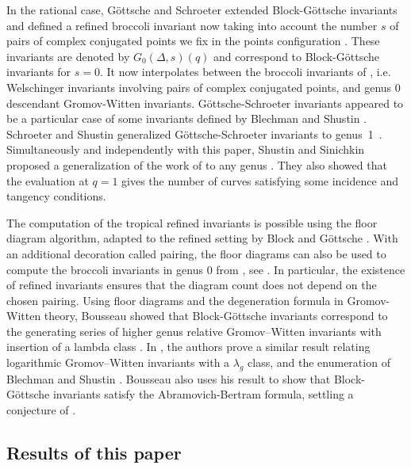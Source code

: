 \documentclass[11pt]{article}
\theoremstyle{definition}
\numberwithin{equation}{section}
\theoremstyle{plain}
\begin{document}
In the rational case, Göttsche and Schroeter extended Block-Göttsche invariants and  defined a refined broccoli invariant now taking into account the number $s$ of pairs of complex conjugated points we fix in the points configuration \cite{gottsche_refined_2019}. These invariants are denoted by $G_0(\Delta,s)(q)$ and correspond to Block-Göttsche invariants for $s=0$. It now interpolates between the broccoli invariants of \cite{gathmann-2013-broccoli}, i.e.  Welschinger invariants involving pairs of complex conjugated points, and genus $0$ descendant Gromov-Witten invariants.  Göttsche-Schroeter invariants appeared to be a particular case of some invariants defined by Blechman and Shustin \cite{blechman-2019-refined}.
Schroeter and Shustin generalized Göttsche-Schroeter invariants to genus~1~\cite{schroeter-2018-refined}. Simultaneously and independently with this paper, Shustin and Sinichkin proposed a generalization of the work of \cite{schroeter-2018-refined} to any genus \cite{shustin-2024-refined}. They also showed that the evaluation at $q = 1$ gives the number of curves satisfying some incidence and tangency conditions.


The computation of the tropical refined invariants is possible using the floor diagram algorithm, adapted to the refined setting by Block and Göttsche \cite{block_refined_2016}. With an additional decoration called pairing, the floor diagrams can also be used to compute the broccoli invariants in genus $0$ from \cite{gottsche_refined_2019}, see \cite{brugalle_polynomiality_2022}. In particular, the existence of refined invariants ensures that the diagram count does not depend on the chosen pairing. 
Using floor diagrams and the degeneration formula in Gromov-Witten theory, Bousseau showed that Block-Göttsche invariants correspond to the generating series of higher genus relative Gromov–Witten invariants with insertion of a lambda class \cite{bousseau_refined_2021}.
In \cite{kennedyhunt-2024-tropical}, the authors prove a similar result relating logarithmic Gromov–Witten invariants with a $\lambda_g$ class, and the enumeration of Blechman and Shustin \cite{blechman-2019-refined}. 
Bousseau also uses his result to show that  
Block-Göttsche invariants satisfy the Abramovich-Bertram formula, settling a conjecture of \cite{brugalle-2020-invariance}. 





\subsection{Results of this paper}
\end{document}
